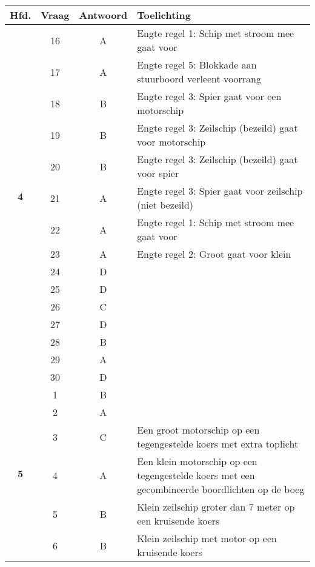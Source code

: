 \begin{table}[h]
	\centering
	\begin{tabular}{c|c|c|m{9.5cm}}
		\textbf{Hfd.}       & \textbf{Vraag} & \textbf{Antwoord} & \textbf{Toelichting}   
		                                          \\ \hline
   		\multirow{14}{*}{\sffamily\bfseries{\textcolor{ocre}{\LARGE4}} }
   		& 16 & A & Engte regel 1: Schip met stroom mee gaat voor \\ \cline{2-4} 
   		& 17 & A & Engte regel 5: Blokkade aan stuurboord verleent voorrang \\ \cline{2-4} 
   		& 18 & B & Engte regel 3: Spier gaat voor een motorschip  \\ \cline{2-4} 
   		& 19 & B & Engte regel 3: Zeilschip (bezeild) gaat voor motorschip \\ \cline{2-4} 
   		& 20 & B & Engte regel 3: Zeilschip (bezeild) gaat voor spier \\ \cline{2-4} 
   		& 21 & A & Engte regel 3: Spier gaat voor zeilschip (niet bezeild) \\ \cline{2-4} 
   		& 22 & A & Engte regel 1: Schip met stroom mee gaat voor \\ \cline{2-4} 
   		& 23 & A & Engte regel 2: Groot gaat voor klein \\ \cline{2-4} 
		& 24 & D & \\ \cline{2-4} 
		& 25 & D & \\ \cline{2-4} 
		& 26 & C & \\ \cline{2-4} 
		& 27 & D & \\ \cline{2-4} 
		& 28 & B & \\ \cline{2-4} 
		& 29 & A & \\ \cline{2-4} 
		& 30 & D & \\ \cline{2-4} \hline
   		\multirow{7}{*}{\sffamily\bfseries{\textcolor{ocre}{\LARGE5}} } 
   		& 1 & B & \\ \cline{2-4} 
   		& 2 & A &  \\ \cline{2-4} 
   		& 3 & C & Een groot motorschip op een tegengestelde koers met extra toplicht \\ \cline{2-4} 
   		& 4 & A & Een klein motorschip op een tegengestelde koers met een gecombineerde boordlichten op de boeg \\ \cline{2-4} 
   		& 5 & B &  Klein zeilschip groter dan 7 meter op een kruisende koers \\ \cline{2-4} 
   		& 6 & B &  Klein zeilschip met motor op een kruisende koers\\ \cline{2-4} 

\end{tabular}
\end{table}
